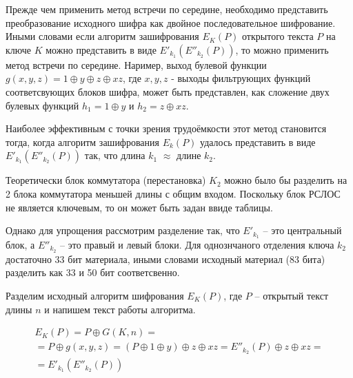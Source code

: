 \documentclass[a4paper,12pt]{article}
\theoremstyle{definition}
\begin{document}
	Прежде чем применить метод встречи по середине, необходимо представить преобразование исходного шифра как двойное последовательное шифрование. Иными словами если алгоритм зашифрования $E_K(P)$ открытого текста $P$ на ключе $K$ можно представить в виде $E'_{k_1}(E''_{k_2}(P))$, то можно применить метод встречи по середине. Наример, выход булевой функции $g(x,y,z) = 1 \oplus y \oplus z \oplus x z$, где $x, y, z$ - выходы фильтрующих функций соответсвующих блоков шифра, может быть представлен, как сложение двух булевых функций $ h_1=1 \oplus y $ и $ h_2=z \oplus x z $. 
	
	Наиболее эффективным с точки зрения трудоёмкости этот метод становится тогда, когда алгоритм зашифрования $E_k(P)$ удалось представить в виде $E'_{k_1}(E''_{k_2}(P))$ так, что длина $k_1$ $\approx$ длине $k_2$.
	
	Теоретически блок коммутатора (перестановка) $K_2$ можно было бы разделить на 2 блока коммутатора меньшей длины с общим входом. Поскольку блок РСЛОС не является ключевым, то он может быть задан ввиде таблицы.
	
	Однако для упрощения рассмотрим разделение так, что $E'_{k_1}$ -- это центральный блок, а $E''_{k_2}$ -- это правый и левый блоки. Для однознчаного отделения ключа $k_2$ достаточно $33$ бит материала, иными словами исходный материал (83 бита) разделить как 33 и 50 бит соответсвенно.
	
	Разделим исходный алгоритм шифрования $E_K(P)$, где $P$ -- открытый текст длины $n$ и напишем текст работы алгоритма.

	\begin{multline*}	
	E_K(P) = P \oplus G(K, n) = \\ = P \oplus g(x,y,z) = (P \oplus 1 \oplus y) \oplus z \oplus x z = E''_{k_2}(P) \oplus z \oplus x z = \\ = E'_{k_1}(E''_{k_2}(P))
	\end{multline*}
	
\end{document}
